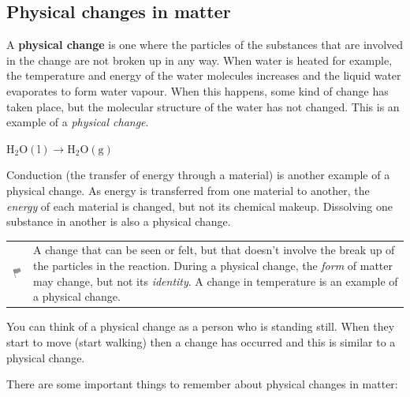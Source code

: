             \subsection{ Physical changes in matter}
            \nopagebreak
      \label{m38709*id62200}A \textbf{physical change} is one where the particles of the substances that are involved in the change are not broken up in any way. When water is heated for example, the temperature and energy of the water molecules increases and the liquid water evaporates to form water vapour. When this happens, some kind of change has taken place, but the molecular structure of the water has not changed. This is an example of a \textsl{physical change}.\par 
      \label{m38709*id62556}$\mathrm{H}{}_{2}\mathrm{O}\left(\mathrm{l}\right)\to \mathrm{H}{}_{2}\mathrm{O}\left(\mathrm{g}\right)$
      \par 
      \label{m38709*id62600}Conduction (the transfer of energy through a material) is another example of a physical change. As energy is transferred from one material to another, the \textsl{energy} of each material is changed, but not its chemical makeup. Dissolving one substance in another is also a physical change.\par 
\label{m38709*fhsst!!!underscore!!!id76}\begin{definition}
	  \begin{tabular*}{15 cm}{m{15 mm}m{}}
	\hspace*{-50pt}  \includegraphics[width=0.5in]{col11305.imgs/psflag2.png}   & \Definition{   \label{id2458225}\textbf{ Physical change }} { \label{m38709*meaningfhsst!!!underscore!!!id76}
      A change that can be seen or felt, but that doesn't involve the break up of the particles in the reaction. During a physical change, the \textsl{form} of matter may change, but not its \textsl{identity}. A change in temperature is an example of a physical change. 
       } 
      \end{tabular*}
      \end{definition}
\label{m38709*id0209834} You can think of a physical change as a person who is standing still. When they start to move (start walking) then a change has occurred and this is similar to a physical change. \par 
      \label{m38709*id62640}There are some important things to remember about physical changes in matter:\par 
